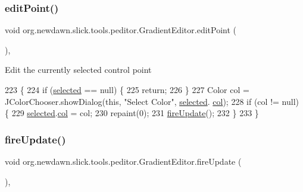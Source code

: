 \subsubsection{\texorpdfstring{edit\+Point()}{editPoint()}}
{\footnotesize\ttfamily void org.\+newdawn.\+slick.\+tools.\+peditor.\+Gradient\+Editor.\+edit\+Point (\begin{DoxyParamCaption}{ }\end{DoxyParamCaption})\hspace{0.3cm}{\ttfamily [inline]}, {\ttfamily [private]}}

Edit the currently selected control point 
\begin{DoxyCode}
223                              \{
224         \textcolor{keywordflow}{if} (\mbox{\hyperlink{classorg_1_1newdawn_1_1slick_1_1tools_1_1peditor_1_1_gradient_editor_a54ab0ad96c4492a2ccfd517dfcfe535b}{selected}} == null) \{
225             \textcolor{keywordflow}{return};
226         \}
227         Color col = JColorChooser.showDialog(\textcolor{keyword}{this}, \textcolor{stringliteral}{"Select Color"}, \mbox{\hyperlink{classorg_1_1newdawn_1_1slick_1_1tools_1_1peditor_1_1_gradient_editor_a54ab0ad96c4492a2ccfd517dfcfe535b}{selected}}.
      \mbox{\hyperlink{classorg_1_1newdawn_1_1slick_1_1tools_1_1peditor_1_1_gradient_editor_1_1_control_point_a330dad2b12917ff9c82aa59990bc3eaa}{col}});
228         \textcolor{keywordflow}{if} (col != null) \{
229             \mbox{\hyperlink{classorg_1_1newdawn_1_1slick_1_1tools_1_1peditor_1_1_gradient_editor_a54ab0ad96c4492a2ccfd517dfcfe535b}{selected}}.\mbox{\hyperlink{classorg_1_1newdawn_1_1slick_1_1tools_1_1peditor_1_1_gradient_editor_1_1_control_point_a330dad2b12917ff9c82aa59990bc3eaa}{col}} = col;
230             repaint(0);
231             \mbox{\hyperlink{classorg_1_1newdawn_1_1slick_1_1tools_1_1peditor_1_1_gradient_editor_aaafac407b447cb37d6f3c204681382bd}{fireUpdate}}();
232         \}
233     \}
\end{DoxyCode}
\mbox{\label{classorg_1_1newdawn_1_1slick_1_1tools_1_1peditor_1_1_gradient_editor_aaafac407b447cb37d6f3c204681382bd}} 
\subsubsection{\texorpdfstring{fire\+Update()}{fireUpdate()}}
{\footnotesize\ttfamily void org.\+newdawn.\+slick.\+tools.\+peditor.\+Gradient\+Editor.\+fire\+Update (\begin{DoxyParamCaption}{ }\end{DoxyParamCaption})\hspace{0.3cm}{\ttfamily [inline]}, {\ttfamily [private]}}

